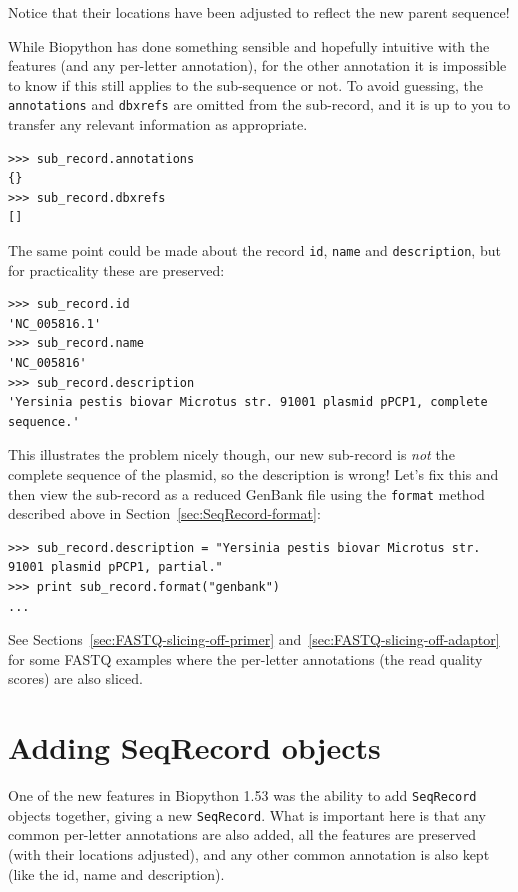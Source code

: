 \documentclass{report}
\begin{document}
\noindent Notice that their locations have been adjusted to reflect the new parent sequence!

While Biopython has done something sensible and hopefully intuitive with the features
(and any per-letter annotation), for the other annotation it is impossible to know if
this still applies to the sub-sequence or not. To avoid guessing, the \texttt{annotations}
and \texttt{dbxrefs} are omitted from the sub-record, and it is up to you to transfer
any relevant information as appropriate.

\begin{verbatim}
>>> sub_record.annotations
{}
>>> sub_record.dbxrefs
[]
\end{verbatim}

The same point could be made about the record \texttt{id}, \texttt{name}
and \texttt{description}, but for practicality these are preserved:

\begin{verbatim}
>>> sub_record.id
'NC_005816.1'
>>> sub_record.name
'NC_005816'
>>> sub_record.description
'Yersinia pestis biovar Microtus str. 91001 plasmid pPCP1, complete sequence.'
\end{verbatim}

\noindent This illustrates the problem nicely though, our new sub-record is
\emph{not} the complete sequence of the plasmid, so the description is wrong!
Let's fix this and then view the sub-record as a reduced GenBank file using
the \texttt{format} method described above in Section~\ref{sec:SeqRecord-format}:

\begin{verbatim}
>>> sub_record.description = "Yersinia pestis biovar Microtus str. 91001 plasmid pPCP1, partial."
>>> print sub_record.format("genbank")
...
\end{verbatim}

See Sections~\ref{sec:FASTQ-slicing-off-primer}
and~\ref{sec:FASTQ-slicing-off-adaptor} for some FASTQ examples where the
per-letter annotations (the read quality scores) are also sliced.

\section{Adding SeqRecord objects}
\label{sec:SeqRecord-addition}

One of the new features in Biopython 1.53 was the ability to add \verb|SeqRecord| objects
together, giving a new \verb|SeqRecord|. What is important here is that any common
per-letter annotations are also added, all the features are preserved (with their
locations adjusted), and any other common annotation is also kept (like the id, name
and description).
\end{document}
